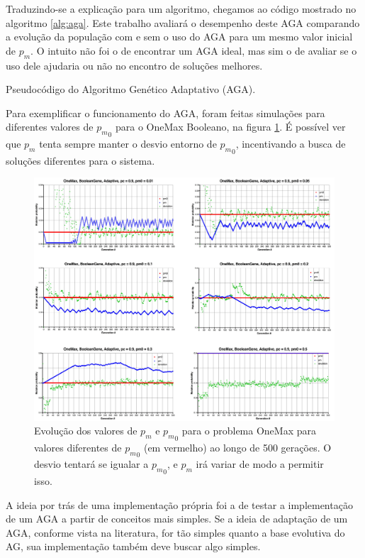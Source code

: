 Traduzindo-se a explicação para um algoritmo, chegamos ao código mostrado no algoritmo \ref{alg:aga}. Este trabalho avaliará o desempenho deste AGA comparando a evolução da população com e sem o uso do AGA para um mesmo valor inicial de $p_m$. O intuito não foi o de encontrar um AGA ideal, mas sim o de avaliar se o uso dele ajudaria ou não no encontro de soluções melhores.

\begin{algorithm}[ht]
\caption{Pseudocódigo do Algoritmo Genético Adaptativo (AGA).}
\label{alg:aga}
\end{algorithm}

Para exemplificar o funcionamento do AGA, foram feitas simulações para diferentes valores de ${p_m}_0$ para o OneMax Booleano, na figura \ref{fig:aga_test}. É possível ver que $p_m$ tenta sempre manter o desvio entorno de ${p_m}_0$, incentivando a busca de soluções diferentes para o sistema.

\begin{figure}[ht!]
    \centering \includegraphics[width=1.0\textwidth]{boolean_onemax_aga.jpg}
    \caption{Evolução dos valores de $p_m$ e ${p_m}_0$ para o problema OneMax para valores diferentes de ${p_m}_0$ (em vermelho) ao longo de 500 gerações. O desvio tentará se igualar a ${p_m}_0$, e $p_m$ irá variar de modo a permitir isso.}
    \label{fig:aga_test}
\end{figure}

A ideia por trás de uma implementação própria foi a de testar a implementação de um AGA a partir de conceitos mais simples. Se a ideia de adaptação de um AGA, conforme vista na literatura, for tão simples quanto a base evolutiva do AG, sua implementação também deve buscar algo simples.

